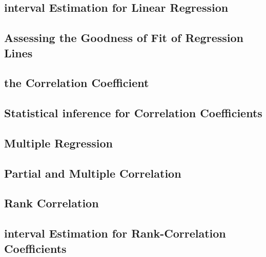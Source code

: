 \documentclass[12pt,]{article}
\begin{document}
\hypertarget{interval-estimation-for-linear-regression}{%
\subsection{interval Estimation for Linear
Regression}\label{interval-estimation-for-linear-regression}}

\hypertarget{assessing-the-goodness-of-fit-of-regression-lines}{%
\subsection{Assessing the Goodness of Fit of Regression
Lines}\label{assessing-the-goodness-of-fit-of-regression-lines}}

\hypertarget{the-correlation-coefficient}{%
\subsection{the Correlation
Coefficient}\label{the-correlation-coefficient}}

\hypertarget{statistical-inference-for-correlation-coefficients}{%
\subsection{Statistical inference for Correlation
Coefficients}\label{statistical-inference-for-correlation-coefficients}}

\hypertarget{multiple-regression}{%
\subsection{Multiple Regression}\label{multiple-regression}}

\hypertarget{partial-and-multiple-correlation}{%
\subsection{Partial and Multiple
Correlation}\label{partial-and-multiple-correlation}}

\hypertarget{rank-correlation}{%
\subsection{Rank Correlation}\label{rank-correlation}}

\hypertarget{interval-estimation-for-rank-correlation-coefficients}{%
\subsection{interval Estimation for Rank-Correlation
Coefficients}\label{interval-estimation-for-rank-correlation-coefficients}}
\end{document}
